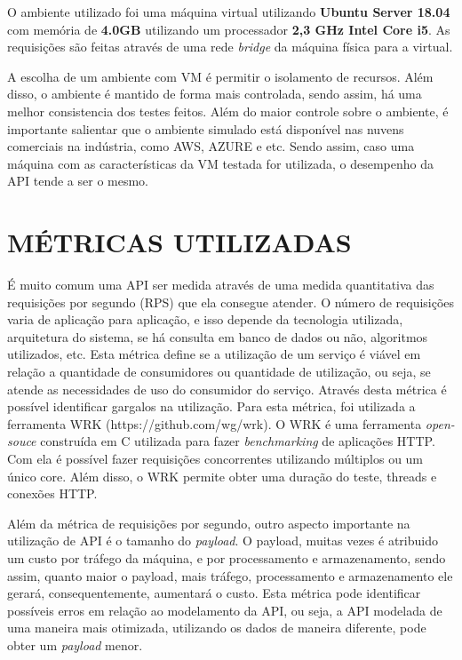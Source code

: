 O ambiente utilizado foi uma máquina virtual utilizando \textbf{Ubuntu Server 18.04}
com memória de \textbf{4.0GB} utilizando um processador \textbf{2,3 GHz Intel Core i5}. 
As requisições são feitas através de uma rede \textit{bridge} da máquina física para a virtual.

A escolha de um ambiente com VM é permitir o isolamento de recursos. Além disso,
o ambiente é mantido de forma mais controlada, sendo assim, há uma melhor 
consistencia dos testes feitos. Além do maior controle sobre o ambiente, é importante salientar 
que o ambiente simulado está disponível nas nuvens comerciais na indústria, como AWS, AZURE e 
etc. Sendo assim, caso uma máquina com as características da VM testada for utilizada, 
o desempenho da API tende a ser o mesmo.

\section{MÉTRICAS UTILIZADAS}
É muito comum uma API ser medida através de uma medida quantitativa das requisições 
por segundo (RPS) que ela consegue atender. O número de requisições 
varia de aplicação para aplicação, e isso depende da tecnologia utilizada, 
arquitetura do sistema, se há consulta em banco de dados ou não, algoritmos utilizados, etc.
Esta métrica define se a utilização de um serviço é viável em relação a quantidade de consumidores ou
quantidade de utilização, ou seja, se atende as necessidades de uso do consumidor do serviço. 
Através desta métrica é possível identificar gargalos na utilização. Para esta métrica, foi utilizada 
a ferramenta WRK (https://github.com/wg/wrk). O WRK é uma ferramenta \textit{open-souce}  construída em C utilizada 
para fazer \textit{benchmarking} de aplicações HTTP. Com ela é possível fazer requisições 
concorrentes utilizando múltiplos ou um único core. Além disso, o WRK permite obter uma duração
do teste, threads e conexões HTTP.

Além da métrica de requisições por segundo, outro aspecto importante na utilização de API
é o tamanho do \textit{payload}. O payload, muitas vezes é atribuido um custo por 
tráfego da máquina, e por processamento e armazenamento, sendo assim, quanto maior
o payload, mais tráfego, processamento e armazenamento ele gerará, consequentemente,
aumentará o custo. Esta métrica pode identificar possíveis erros em relação 
ao modelamento da API, ou seja, a API modelada de uma maneira mais otimizada, utilizando os dados
de maneira diferente, pode obter um \textit{payload} menor.

